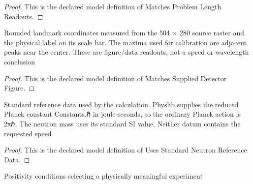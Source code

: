 \begin{proof}
  This is the declared model definition of Matches Problem Length Readouts.
\end{proof}
\begin{definition}
  \label{def:physics:phyx-mini-0500:phyxminiproblems-problemphyxmini0500-matchessupplieddetectorfigure}
  Rounded landmark coordinates measured from the 504 × 280 source raster and the physical label on its scale bar. The maxima used for calibration are adjacent peaks near the center. These are figure/data readouts, not a speed or wavelength conclusion
\end{definition}
\begin{proof}
  This is the declared model definition of Matches Supplied Detector Figure.
\end{proof}
\begin{definition}
  \label{def:physics:phyx-mini-0500:phyxminiproblems-problemphyxmini0500-usesstandardneutronreferencedata}
  Standard reference data used by the calculation. Physlib supplies the reduced Planck constant Constants.ℏ in joule-seconds, so the ordinary Planck action is 2πℏ. The neutron mass uses its standard SI value. Neither datum contains the requested speed
\end{definition}
\begin{proof}
  This is the declared model definition of Uses Standard Neutron Reference Data.
\end{proof}
\begin{definition}
  \label{def:physics:phyx-mini-0500:phyxminiproblems-problemphyxmini0500-hasphysicalneutroninterferenceparameters}
  Positivity conditions selecting a physically meaningful experiment
\end{definition}
